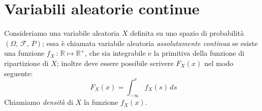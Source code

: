     \section{Variabili aleatorie continue}
        \begin{defn}\label{defn:Variabile_aleatoria_continua}
            Consideriamo una variabile aleatoria $X$ definita su uno spazio di probabilità $(\Omega,\,\mathscr{F},\,P)$; essa è chiamata variabile aleatoria \emph{assolutamente continua} se esiste una funzione $f_X\,:\, \mathbb{R} \mapsto \mathbb{R^+}$, che sia integrabile e la primitiva della funzione di ripartizione di $X$; inoltre deve essere possibile scrivere $F_X(x)$ nel modo seguente:
            \begin{equation}
                F_X(x) = \int_{-\infty}^{x} f_X(s)\, ds 
            \end{equation}
            Chiamiamo \emph{densità} di $X$ la funzione $f_X(x)$.
        \end{defn}
